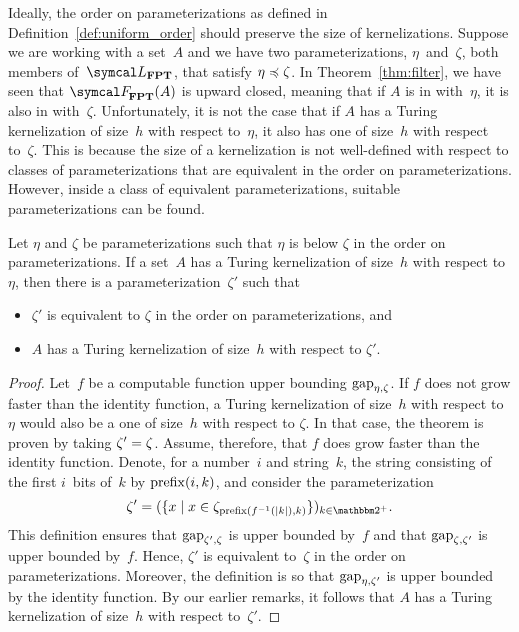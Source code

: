 Ideally, the order on parameterizations as defined in Definition~\ref{def:uniform_order} should preserve the size of kernelizations.
Suppose we are working with a set~$A$ and we have two parameterizations, $\eta$~and~$\zeta$, both members of~$\calL_\cl{FPT}$, that satisfy $\eta \preccurlyeq \zeta$.
In Theorem~\ref{thm:filter}, we have seen that $\calF_\cl{FPT}(A)$ is upward closed, meaning that if $A$ is in  with~$\eta$, it is also in  with~$\zeta$.
Unfortunately, it is not the case that if $A$ has a Turing kernelization of size~$h$ with respect to~$\eta$, it also has one of size~$h$ with respect to~$\zeta$.
This is because the size of a kernelization is not well-defined with respect to classes of parameterizations that are equivalent in the order on parameterizations.
However, inside a class of equivalent parameterizations, suitable parameterizations can be found.
\begin{theorem}
  Let $\eta$ and $\zeta$ be parameterizations such that $\eta$ is below $\zeta$ in the order on parameterizations.
  If a set~$A$ has a Turing kernelization of size~$h$ with respect to $\eta$, then there is a parameterization~$\zeta'$ such that
  \begin{itemize}
  \item $\zeta'$ is equivalent to $\zeta$ in the order on parameterizations, and
  \item $A$ has a Turing kernelization of size~$h$ with respect to $\zeta'$.
  \end{itemize}
\end{theorem}
\begin{proof}
  Let~$f$ be a computable function upper bounding $\operatorname{gap}_{\eta, \zeta}$.
  If $f$ does not grow faster than the identity function, a Turing kernelization of size~$h$ with respect to $\eta$ would also be a one of size~$h$ with respect to $\zeta$.
  In that case, the theorem is proven by taking $\zeta' = \zeta$.
  Assume, therefore, that $f$ does grow faster than the identity function.
  Denote, for a number~$i$ and string~$k$, the string consisting of the first $i$~bits of~$k$ by $\operatorname{prefix}(i, k)$, and consider the parameterization
  \begin{equation*}
    \zeta' \deq (\{x \st x \in \zeta_{\prefix(f^{-1}(\length{k}), k)}\})_{k \in \binary^+}.
  \end{equation*}
  This definition ensures that $\operatorname{gap}_{\zeta', \zeta}$ is upper bounded by~$f$ and that $\operatorname{gap}_{\zeta, \zeta'}$ is upper bounded by~$f$.
  Hence, $\zeta'$ is equivalent to~$\zeta$ in the order on parameterizations.
  Moreover, the definition is so that $\operatorname{gap}_{\eta, \zeta'}$ is upper bounded by the identity function.
  By our earlier remarks, it follows that $A$ has a Turing kernelization of size~$h$ with respect to~$\zeta'$.
\end{proof}

